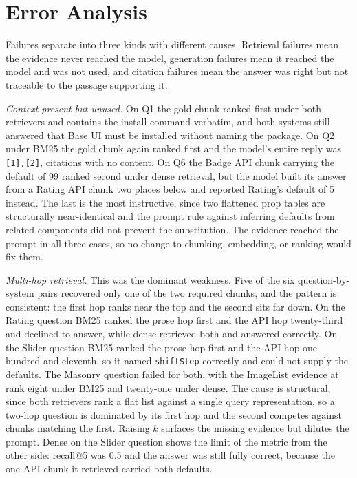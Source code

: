 \documentclass[10pt,a4paper]{article}
\begin{document}
\section{Error Analysis}

Failures separate into three kinds with different causes. Retrieval failures mean the evidence never reached the model, generation failures mean it reached the model and was not used, and citation failures mean the answer was right but not traceable to the passage supporting it.

\textit{Context present but unused.} On Q1 the gold chunk ranked first under both retrievers and contains the install command verbatim, and both systems still answered that Base UI must be installed without naming the package. On Q2 under BM25 the gold chunk again ranked first and the model's entire reply was \texttt{[1],[2]}, citations with no content. On Q6 the Badge API chunk carrying the default of 99 ranked second under dense retrieval, but the model built its answer from a Rating API chunk two places below and reported Rating's default of 5 instead. The last is the most instructive, since two flattened prop tables are structurally near-identical and the prompt rule against inferring defaults from related components did not prevent the substitution. The evidence reached the prompt in all three cases, so no change to chunking, embedding, or ranking would fix them.

\textit{Multi-hop retrieval.} This was the dominant weakness. Five of the six question-by-system pairs recovered only one of the two required chunks, and the pattern is consistent: the first hop ranks near the top and the second sits far down. On the Rating question BM25 ranked the prose hop first and the API hop twenty-third and declined to answer, while dense retrieved both and answered correctly. On the Slider question BM25 ranked the prose hop first and the API hop one hundred and eleventh, so it named \texttt{shiftStep} correctly and could not supply the defaults. The Masonry question failed for both, with the ImageList evidence at rank eight under BM25 and twenty-one under dense. The cause is structural, since both retrievers rank a flat list against a single query representation, so a two-hop question is dominated by its first hop and the second competes against chunks matching the first. Raising $k$ surfaces the missing evidence but dilutes the prompt. Dense on the Slider question shows the limit of the metric from the other side: recall@5 was 0.5 and the answer was still fully correct, because the one API chunk it retrieved carried both defaults.
\end{document}
